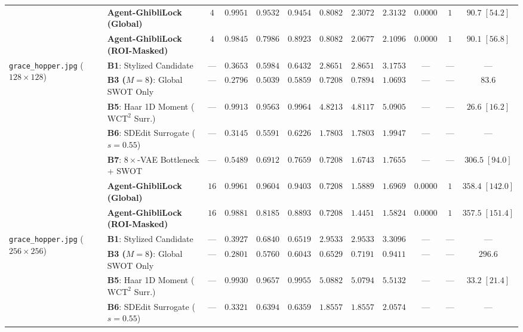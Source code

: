 \documentclass[conference,10pt]{IEEEtran}
\begin{document}
\begin{table}[t!]
{\begin{tabular}{llcccccccccc}
& \textbf{Agent-GhibliLock (Global)} & $4$ & $\mathbf{0.9951}$ & $\mathbf{0.9532}$ & $0.9454$ & $0.8082$ & $2.3072$ & $2.3132$ & $\mathbf{0.0000}$ & $1$ & $90.7\;[\mathbf{54.2}]$ \\
& \textbf{Agent-GhibliLock (ROI-Masked)} & $4$ & $0.9845$ & $0.7986$ & $0.8923$ & $0.8082$ & $2.0677$ & $2.1096$ & $\mathbf{0.0000}$ & $1$ & $90.1\;[\mathbf{56.8}]$ \\
\midrule
\multirow{7}{*}{\texttt{grace\_hopper.jpg} ($128\times 128$)}
& \textbf{B1}: Stylized Candidate & --- & $0.3653$ & $0.5984$ & $0.6432$ & $2.8651$ & $2.8651$ & $3.1753$ & --- & --- & --- \\
& \textbf{B3 ($M=8$)}: Global SWOT Only & --- & $0.2796$ & $0.5039$ & $0.5859$ & $0.7208$ & $\mathbf{0.7894}$ & $\mathbf{1.0693}$ & --- & --- & $83.6$ \\
& \textbf{B5}: Haar 1D Moment ($\text{WCT}^2$ Surr.)~\cite{yoo2019wct2} & --- & $0.9913$ & $0.9563$ & $\mathbf{0.9964}$ & $4.8213$ & $4.8117$ & $5.0905$ & --- & --- & $26.6\;[16.2]$ \\
& \textbf{B6}: SDEdit Surrogate ($s=0.55$)~\cite{meng2022sdedit} & --- & $0.3145$ & $0.5591$ & $0.6226$ & $1.7803$ & $1.7803$ & $1.9947$ & --- & --- & --- \\
& \textbf{B7}: $8\times$-VAE Bottleneck + SWOT~\cite{zhang2023} & --- & $0.5489$ & $0.6912$ & $0.7659$ & $0.7208$ & $1.6743$ & $1.7655$ & --- & --- & $306.5\;[94.0]$ \\
& \textbf{Agent-GhibliLock (Global)} & $16$ & $\mathbf{0.9961}$ & $\mathbf{0.9604}$ & $0.9403$ & $0.7208$ & $1.5889$ & $1.6969$ & $\mathbf{0.0000}$ & $1$ & $358.4\;[\mathbf{142.0}]$ \\
& \textbf{Agent-GhibliLock (ROI-Masked)} & $16$ & $0.9881$ & $0.8185$ & $0.8893$ & $0.7208$ & $1.4451$ & $1.5824$ & $\mathbf{0.0000}$ & $1$ & $357.5\;[\mathbf{151.4}]$ \\
\midrule
\multirow{7}{*}{\texttt{grace\_hopper.jpg} ($256\times 256$)}
& \textbf{B1}: Stylized Candidate & --- & $0.3927$ & $0.6840$ & $0.6519$ & $2.9533$ & $2.9533$ & $3.3096$ & --- & --- & --- \\
& \textbf{B3 ($M=8$)}: Global SWOT Only & --- & $0.2801$ & $0.5760$ & $0.6043$ & $0.6529$ & $\mathbf{0.7191}$ & $\mathbf{0.9411}$ & --- & --- & $296.6$ \\
& \textbf{B5}: Haar 1D Moment ($\text{WCT}^2$ Surr.)~\cite{yoo2019wct2} & --- & $0.9930$ & $0.9657$ & $\mathbf{0.9955}$ & $5.0882$ & $5.0794$ & $5.5132$ & --- & --- & $33.2\;[21.4]$ \\
& \textbf{B6}: SDEdit Surrogate ($s=0.55$)~\cite{meng2022sdedit} & --- & $0.3321$ & $0.6394$ & $0.6359$ & $1.8557$ & $1.8557$ & $2.0574$ & --- & --- & --- \\

\end{tabular}}
\end{table}
\end{document}
